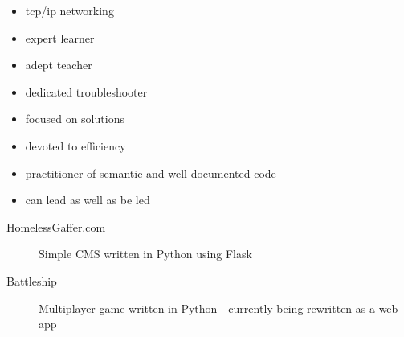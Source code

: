 \documentclass[letterpaper]{article}        %
\begin{document}
\begin{multicols}{3}
      \begin{itemize}
            \end{itemize}
    
      \begin{itemize}
        \item tcp/ip networking
        \end{itemize}
    
      \begin{itemize}
        \item expert learner
        \item adept teacher
        \item dedicated troubleshooter
        \item focused on solutions
        \item devoted to efficiency
        \item practitioner of semantic and well documented code
        \item can lead as well as be led
        \end{itemize}
    
    
  \end{multicols}


  \begin{description}
    \item[HomelessGaffer.com] Simple CMS written in Python using Flask
    \item[Battleship] Multiplayer game written in Python---currently being rewritten as a web app
    
  \end{description}
\end{document}
